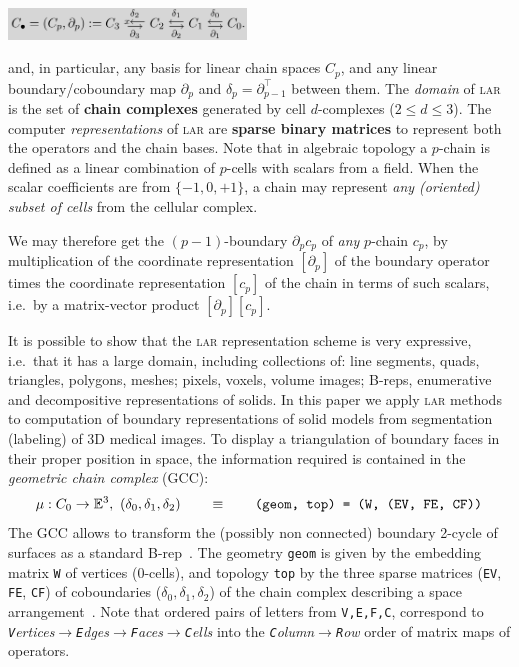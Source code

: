\documentclass[11pt, oneside]{amsart}   	%
\begin{document}
{   
   \centering\vspace{1mm}
   \includegraphics[width=0.475\textwidth]{figs/complex} 

}

\noindent
and, in particular, any basis for linear chain spaces $C_p$, and any linear
boundary/coboundary map \(\partial_p\) and
\(\delta_p=\partial_{p-1}^\top\) between them. The \emph{domain} of \textsc{lar} is the set of \textbf{chain complexes} generated by cell $d$-complexes ($2\leq d\leq 3$). The computer \emph{representations} of \textsc{lar} are \textbf{sparse binary matrices} to represent both the operators and the chain bases. Note that in algebraic topology a $p$-chain is defined as a linear combination of $p$-cells with scalars from a field. When the scalar coefficients are from $\{-1, 0, +1\}$, a chain may represent \emph{any (oriented) subset of cells} from the cellular complex. 

We may therefore get the $(p-1)$-boundary $\partial_p c_p$ of \emph{any} $p$-chain $c_p$, by multiplication of the coordinate representation $[\partial_p]$ of the boundary operator times the coordinate representation $[c_p]$ of the chain in terms of such scalars, i.e.~by a  matrix-vector product $ [\partial_p] [c_p] $.

It is possible to show that the \textsc{lar} representation scheme is very expressive, i.e.~that it  has a large domain,  including collections of: line segments, quads, triangles, polygons, meshes;  pixels, voxels, volume images; B-reps, enumerative and decompositive representations of solids. 
In this paper we apply \textsc{lar} methods to computation of boundary representations of solid models from segmentation (labeling) of 3D medical images.
To display a triangulation of  boundary faces  in their proper position in space, the information required is contained in the \emph{geometric chain complex} (GCC):
\[
\mu: C_0\to\mathbb{E}^3,\ (\delta_0, \delta_1, \delta_2)
\qquad\equiv\qquad
\texttt{(geom, top) = (W, (EV, FE, CF))}
\]
The GCC allows to transform the (possibly non connected) boundary 2-cycle of surfaces as a standard B-rep~\cite{shapiroSM:202}. 
The geometry \texttt{geom} is given by
the embedding matrix \texttt{W} of vertices (0-cells), and  topology \texttt{top} by the three sparse matrices (\texttt{EV}, \texttt{FE}, \texttt{CF}) of coboundaries ($\delta_0, \delta_1, \delta_2$) of the chain complex describing a   
space arrangement~\cite{paoluzzi2019finite}.
Note that ordered pairs of letters from \texttt{V,E,F,C}, correspond to \emph{\emph{\texttt{V}}ertices$\to$\emph{\texttt{E}}dges$\to$\emph{\texttt{F}}aces$\to$\emph{\texttt{C}}ells} into the 
\emph{\emph{\texttt{C}}olumn$\to$\emph{\texttt{R}}ow} order of matrix maps of operators.
\end{document}
